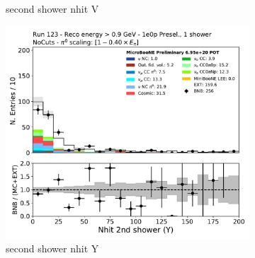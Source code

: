 \begin{figure}[H]
\begin{subfigure}{0.3\textwidth}
    \caption{second shower nhit V}
    \end{subfigure}
    \begin{subfigure}{0.3\textwidth}
    \includegraphics[width=1.0\textwidth]{1e0p/High_E_Sideband/secondshower_Y_nhit.pdf}
    \caption{second shower nhit Y}
    \end{subfigure}
    \caption{} 
    \label{fig:HE_1eNp_1}
\end{figure}

